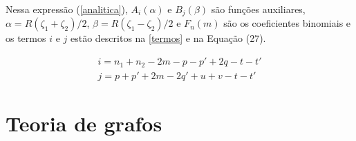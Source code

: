 Nessa expressão (\autoref{analitica}), $A_i (\alpha)$ e $B_j (\beta)$ são funções auxiliares, $\alpha = R(\zeta_1 + \zeta_2)/2$, $\beta = R(\zeta_1 - \zeta_2)/2$ e $F_n(m)$ são os coeficientes binomiais \autocite{Mekelleche1997} e os termos $i$ e $j$ estão descritos na \autoref{termos} e na Equação (27).

\begin{align}
\label{termos}
    i = n_1 + n_2 - 2m - p - p' + 2q - t - t' \\[0.35cm]
    j = p + p' + 2m - 2q' + u + v - t - t'
\end{align}







\section{Teoria de grafos}

